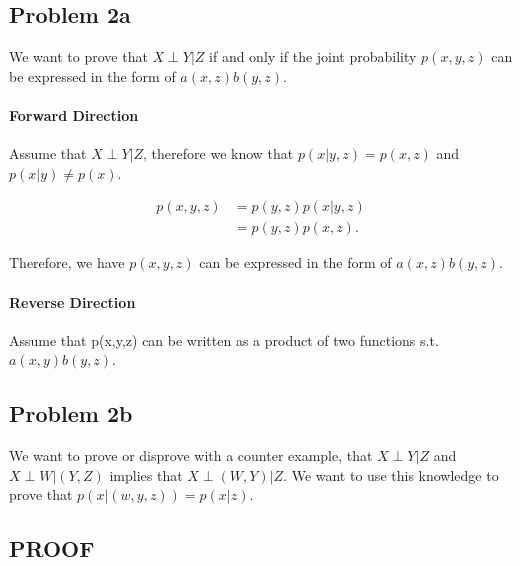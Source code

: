 \documentclass[paper=a4, fontsize=11pt]{scrartcl} %
\begin{document}
\subsection{Problem 2a}
We want to prove that $X \perp Y|Z$ if and only if the joint probability $p(x,y,z)$ can be expressed in the form of $a(x,z)b(y,z)$.
\paragraph{Forward Direction}
Assume that $X \perp Y|Z$, therefore we know that $p(x|y,z) = p(x,z)$ and $p(x|y) \neq p(x)$.

\begin{align}
p(x,y,z) &= p(y,z)p(x|y,z) \\
&= p(y,z)p(x,z).
\end{align}

Therefore, we have $p(x,y,z)$ can be expressed in the form of $a(x,z)b(y,z)$.

\paragraph{Reverse Direction}
Assume that p(x,y,z) can be written as a product of two functions s.t. $a(x,y)b(y,z)$.

\subsection{Problem 2b}
 We want to prove or disprove with a counter example, that $X \perp Y|Z$ and $X \perp W|(Y,Z)$ implies that $X \perp (W,Y)|Z$.
We want to use this knowledge to prove that $p(x|(w,y,z)) = p(x|z)$.

\subsection{PROOF}
\begin{align}

\end{align}

 
\end{document}
